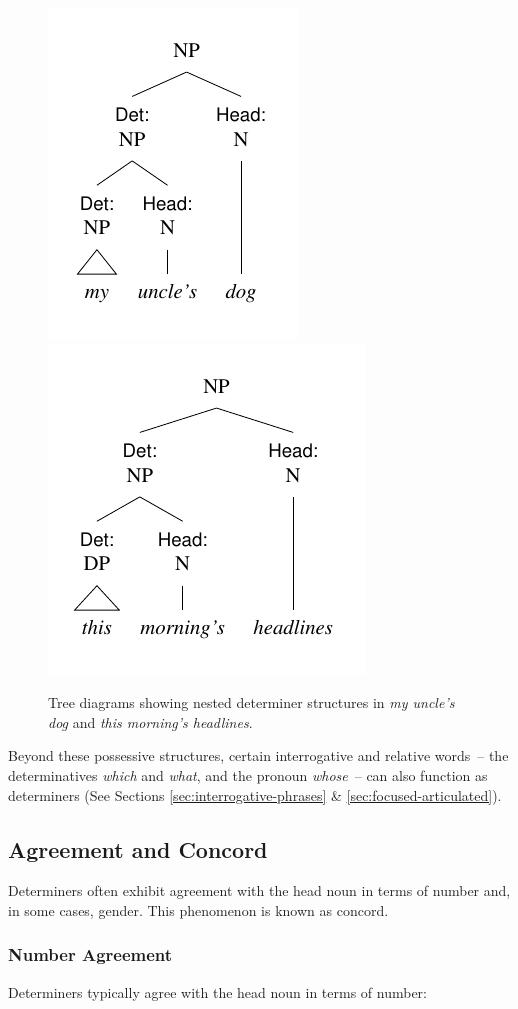 \begin{figure}
    \centering
    \includegraphics[width=0.315\linewidth]{figures/my-uncles-dog.pdf}
    \includegraphics[width=0.4\linewidth]{figures/this-mornings-headlines.pdf}
    \caption{Tree diagrams showing nested determiner structures in \textit{my uncle's dog} and \textit{this morning's headlines}.}
    \label{fig:det-det}
\end{figure}

Beyond these possessive structures, certain interrogative and relative words~-- the determinatives \textit{which} and \textit{what}, and the pronoun \textit{whose}~-- can also function as determiners (See Sections \ref{sec:interrogative-phrases} \& \ref{sec:focused-articulated}).

\subsection{Agreement and Concord}

Determiners often exhibit agreement with the head noun in terms of number and, in some cases, gender. This phenomenon is known as concord.

\subsubsection{Number Agreement}
Determiners typically agree with the head noun in terms of number:

